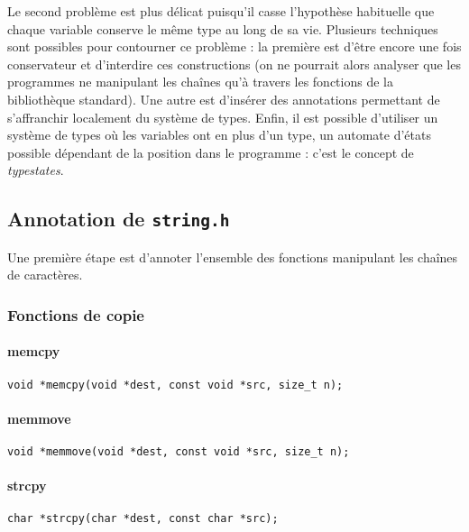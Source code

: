 Le second problème est plus délicat puisqu'il casse l'hypothèse habituelle que
chaque variable conserve le même type au long de sa vie. Plusieurs techniques
sont possibles pour contourner ce problème : la première est d'être encore une
fois conservateur et d'interdire ces constructions (on ne pourrait alors
analyser que les programmes ne manipulant les chaînes qu'à travers les fonctions
de la bibliothèque standard). Une autre est d'insérer des annotations permettant
de s'affranchir localement du système de types. Enfin, il est possible
d'utiliser un système de types où les variables ont en plus d'un type, un
automate d'états possible dépendant de la position dans le programme : c'est le
concept de \emph{typestates}\cite{tse12-typestate}.

\subsection{Annotation de \texttt{string.h}}

Une première étape est d'annoter l'ensemble des fonctions manipulant les chaînes
de caractères.

\subsubsection{Fonctions de copie}

\paragraph{memcpy}

\begin{Verbatim}
void *memcpy(void *dest, const void *src, size_t n);
\end{Verbatim}

\paragraph{memmove}

\begin{Verbatim}
void *memmove(void *dest, const void *src, size_t n);
\end{Verbatim}

\paragraph{strcpy}

\begin{Verbatim}
char *strcpy(char *dest, const char *src);
\end{Verbatim}

